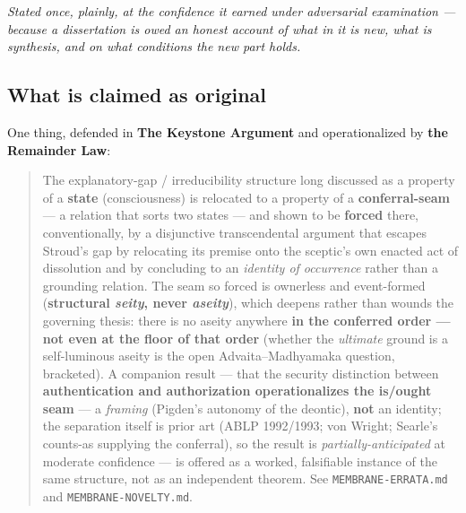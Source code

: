 \documentclass[11pt]{article}
\begin{document}
\emph{Stated once, plainly, at the confidence it earned under adversarial examination — because a dissertation is owed an honest account of what in it is new, what is synthesis, and on what conditions the new part holds.}

\subsection*{What is claimed as original}

One thing, defended in \textbf{The Keystone Argument} and operationalized by \textbf{the Remainder Law}:

\begin{quote}
The explanatory-gap /\allowbreak{} irreducibility structure long discussed as a property of a \textbf{state} (consciousness) is relocated to a property of a \textbf{conferral-seam} — a relation that sorts two states — and shown to be \textbf{forced} there, conventionally, by a disjunctive transcendental argument that escapes Stroud's gap by relocating its premise onto the sceptic's own enacted act of dissolution and by concluding to an \emph{identity of occurrence} rather than a grounding relation. The seam so forced is ownerless and event-formed (\textbf{structural \emph{seity}, never \emph{aseity}}), which deepens rather than wounds the governing thesis: there is no aseity anywhere \textbf{in the conferred order — not even at the floor of that order} (whether the \emph{ultimate} ground is a self-luminous aseity is the open Advaita–Madhyamaka question, bracketed). A companion result — that the security distinction between \textbf{authentication and authorization operationalizes the is/\allowbreak{}ought seam} — a \emph{framing} (Pigden's autonomy of the deontic), \textbf{not} an identity; the separation itself is prior art (ABLP 1992/\allowbreak{}1993; von Wright; Searle's counts-as supplying the conferral), so the result is \emph{partially-anticipated} at moderate confidence — is offered as a worked, falsifiable instance of the same structure, not as an independent theorem. See \texttt{MEMBRANE-ERRATA.md} and \texttt{MEMBRANE-NOVELTY.md}.
\end{quote}
\end{document}

